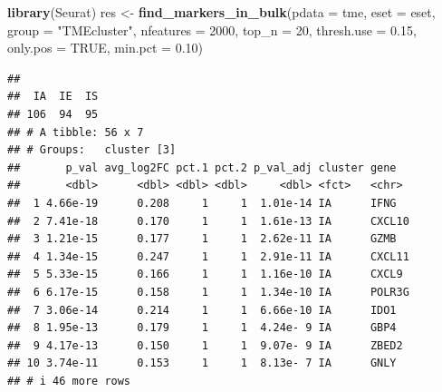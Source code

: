 \documentclass[
  12pt,
]{book}
\newenvironment{Shaded}{\begin{snugshade}}{\end{snugshade}}
\newcommand{\AttributeTok}[1]{\textcolor[rgb]{0.13,0.29,0.53}{#1}}
\newcommand{\ConstantTok}[1]{\textcolor[rgb]{0.56,0.35,0.01}{#1}}
\newcommand{\DecValTok}[1]{\textcolor[rgb]{0.00,0.00,0.81}{#1}}
\newcommand{\FloatTok}[1]{\textcolor[rgb]{0.00,0.00,0.81}{#1}}
\newcommand{\FunctionTok}[1]{\textcolor[rgb]{0.13,0.29,0.53}{\textbf{#1}}}
\newcommand{\NormalTok}[1]{#1}
\newcommand{\OtherTok}[1]{\textcolor[rgb]{0.56,0.35,0.01}{#1}}
\newcommand{\SpecialCharTok}[1]{\textcolor[rgb]{0.81,0.36,0.00}{\textbf{#1}}}
\newcommand{\StringTok}[1]{\textcolor[rgb]{0.31,0.60,0.02}{#1}}
\theoremstyle{definition}
\theoremstyle{definition}
\theoremstyle{definition}
\theoremstyle{definition}
\theoremstyle{remark}
\begin{document}
\begin{Shaded}
\begin{Highlighting}[]
\FunctionTok{library}\NormalTok{(Seurat)}
\NormalTok{res }\OtherTok{\textless{}{-}} \FunctionTok{find\_markers\_in\_bulk}\NormalTok{(}\AttributeTok{pdata      =}\NormalTok{ tme, }
                            \AttributeTok{eset       =}\NormalTok{ eset, }
                            \AttributeTok{group      =} \StringTok{"TMEcluster"}\NormalTok{, }
                            \AttributeTok{nfeatures  =} \DecValTok{2000}\NormalTok{, }
                            \AttributeTok{top\_n      =} \DecValTok{20}\NormalTok{, }
                            \AttributeTok{thresh.use =} \FloatTok{0.15}\NormalTok{, }
                            \AttributeTok{only.pos   =} \ConstantTok{TRUE}\NormalTok{, }
                            \AttributeTok{min.pct    =} \FloatTok{0.10}\NormalTok{)}
\end{Highlighting}
\end{Shaded}

\begin{verbatim}
## 
##  IA  IE  IS 
## 106  94  95 
## # A tibble: 56 x 7
## # Groups:   cluster [3]
##       p_val avg_log2FC pct.1 pct.2 p_val_adj cluster gene  
##       <dbl>      <dbl> <dbl> <dbl>     <dbl> <fct>   <chr> 
##  1 4.66e-19      0.208     1     1  1.01e-14 IA      IFNG  
##  2 7.41e-18      0.170     1     1  1.61e-13 IA      CXCL10
##  3 1.21e-15      0.177     1     1  2.62e-11 IA      GZMB  
##  4 1.34e-15      0.247     1     1  2.91e-11 IA      CXCL11
##  5 5.33e-15      0.166     1     1  1.16e-10 IA      CXCL9 
##  6 6.17e-15      0.158     1     1  1.34e-10 IA      POLR3G
##  7 3.06e-14      0.214     1     1  6.66e-10 IA      IDO1  
##  8 1.95e-13      0.179     1     1  4.24e- 9 IA      GBP4  
##  9 4.17e-13      0.150     1     1  9.07e- 9 IA      ZBED2 
## 10 3.74e-11      0.153     1     1  8.13e- 7 IA      GNLY  
## # i 46 more rows
\end{verbatim}

\begin{Shaded}
\end{Shaded}
\end{document}
